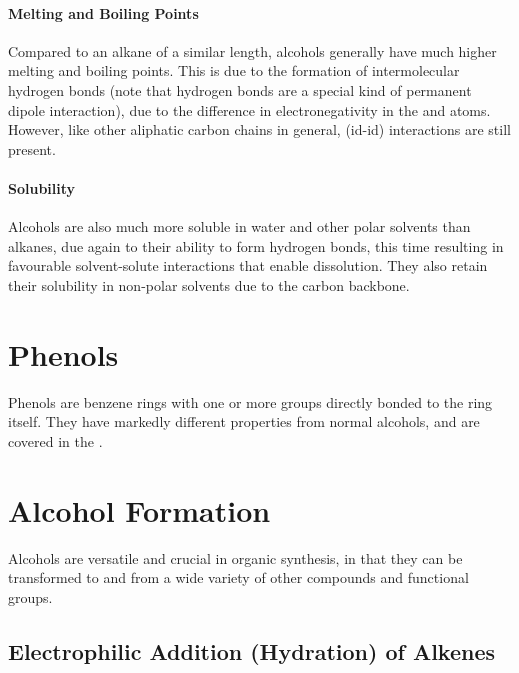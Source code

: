			\paragraph{Melting and Boiling Points}

			Compared to an alkane of a similar length, alcohols generally have much higher melting and boiling points. This is due to
			the formation of intermolecular hydrogen bonds (note that hydrogen bonds are a special kind of permanent dipole interaction),
			due to the difference in electronegativity in the  and  atoms. However, like other aliphatic carbon chains in
			general, \idid{} (id-id) interactions are still present.


			\paragraph{Solubility}

			Alcohols are also much more soluble in water and other polar solvents than alkanes, due again to their ability to form hydrogen
			bonds, this time resulting in favourable solvent-solute interactions that enable dissolution. They also retain their
			solubility in non-polar solvents due to the carbon backbone.


	\pagebreak
	\section{Phenols}

		Phenols are benzene rings with one or more  groups directly bonded to the ring itself. They have markedly different properties
		from normal alcohols, and are covered in the \hyperlink{ChapterPhenols}{}.




	\section{Alcohol Formation}

		Alcohols are versatile and crucial in organic synthesis, in that they can be transformed to and from a wide variety of other
		compounds and functional groups.

		\subsection{Electrophilic Addition (Hydration) of Alkenes}

